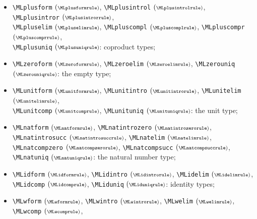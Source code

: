 \documentclass{amsart}
\begin{document}
\begin{itemize}
  \verb|\MLsigmaelim| $(\scriptstyle\MLsigmaelimrule)$, \\
  \verb|\MLsigmacomp| $(\scriptstyle\MLsigmacomprule)$, 
  \verb|\MLsigmauniq| $(\scriptstyle\MLsigmauniqrule)$: dependent pair
  types;
\item \verb|\MLplusform| $(\scriptstyle\MLplusformrule)$, 
  \verb|\MLplusintrol| $(\scriptstyle\MLplusintrolrule)$, 
  \verb|\MLplusintror| $(\scriptstyle\MLplusintrorrule)$, \\
  \verb|\MLpluselim| $(\scriptstyle\MLpluselimrule)$, 
  \verb|\MLpluscompl| $(\scriptstyle\MLpluscomplrule)$, 
  \verb|\MLpluscompr| $(\scriptstyle\MLpluscomprrule)$, \\ 
  \verb|\MLplusuniq| $(\scriptstyle\MLplusuniqrule)$: coproduct types;
\item \verb|\MLzeroform| $(\scriptstyle\MLzeroformrule)$, 
  \verb|\MLzeroelim| $(\scriptstyle\MLzeroelimrule)$, 
  \verb|\MLzerouniq| $(\scriptstyle\MLzerouniqrule)$: the empty type;
\item \verb|\MLunitform| $(\scriptstyle\MLunitformrule)$, 
  \verb|\MLunitintro| $(\scriptstyle\MLunitintrorule)$, 
  \verb|\MLunitelim| $(\scriptstyle\MLunitelimrule)$, \\
  \verb|\MLunitcomp| $(\scriptstyle\MLunitcomprule)$, 
  \verb|\MLunituniq| $(\scriptstyle\MLunituniqrule)$: the unit type;
\item \verb|\MLnatform| $(\scriptstyle\MLnatformrule)$, 
  \verb|\MLnatintrozero| $(\scriptstyle\MLnatintrozerorule)$, \\
  \verb|\MLnatintrosucc| $(\scriptstyle\MLnatintrosuccrule)$, 
  \verb|\MLnatelim| $(\scriptstyle\MLnatelimrule)$, \\
  \verb|\MLnatcompzero| $(\scriptstyle\MLnatcompzerorule)$, 
  \verb|\MLnatcompsucc| $(\scriptstyle\MLnatcompsuccrule)$, \\
  \verb|\MLnatuniq| $(\scriptstyle\MLnatuniqrule)$: the natural number
  type;
\item \verb|\MLidform| $(\scriptstyle\MLidformrule)$,
  \verb|\MLidintro| $(\scriptstyle\MLidintrorule)$,
  \verb|\MLidelim| $(\scriptstyle\MLidelimrule)$, \\
  \verb|\MLidcomp| $(\scriptstyle\MLidcomprule)$,
  \verb|\MLiduniq| $(\scriptstyle\MLiduniqrule)$: identity types;
\item \verb|\MLwform| $(\scriptstyle\MLwformrule)$,
  \verb|\MLwintro| $(\scriptstyle\MLwintrorule)$,
  \verb|\MLwelim| $(\scriptstyle\MLwelimrule)$, \\
  \verb|\MLwcomp| $(\scriptstyle\MLwcomprule)$,

\end{itemize}
\end{document}
